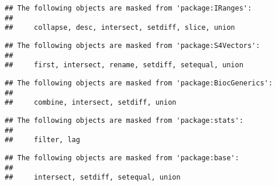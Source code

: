 \documentclass[
]{article}
\begin{document}
\begin{verbatim}
## The following objects are masked from 'package:IRanges':
## 
##     collapse, desc, intersect, setdiff, slice, union
\end{verbatim}

\begin{verbatim}
## The following objects are masked from 'package:S4Vectors':
## 
##     first, intersect, rename, setdiff, setequal, union
\end{verbatim}

\begin{verbatim}
## The following objects are masked from 'package:BiocGenerics':
## 
##     combine, intersect, setdiff, union
\end{verbatim}

\begin{verbatim}
## The following objects are masked from 'package:stats':
## 
##     filter, lag
\end{verbatim}

\begin{verbatim}
## The following objects are masked from 'package:base':
## 
##     intersect, setdiff, setequal, union
\end{verbatim}
\end{document}
